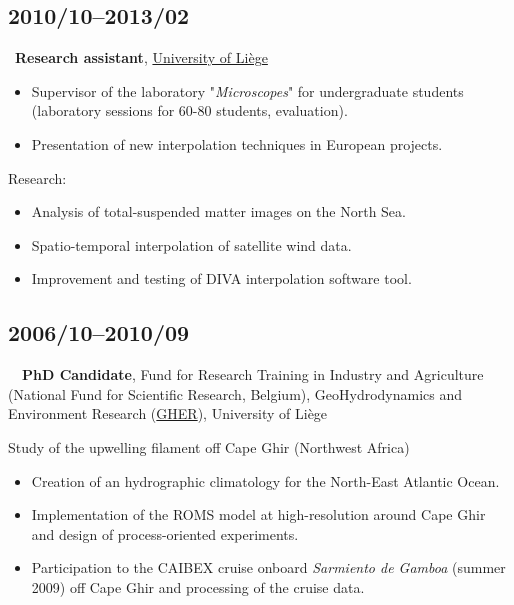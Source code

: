\documentclass[11pt,a4paper,sans,svgnames]{article}
\newlength{\logowidth}
\begin{document}
\subsection{2010/10--2013/02}

~\textbf{Research assistant}, \href{www.ulg.ac.be}{University of Li\`{e}ge}
\begin{itemize}%
\item Supervisor of the laboratory "\textit{Microscopes}" for undergraduate students\\ (laboratory sessions for 60-80 students, evaluation).
\item Presentation of new interpolation techniques in European projects.
\end{itemize}
Research:
\begin{itemize}%
\item Analysis of total-suspended matter images on the North Sea.
\item Spatio-temporal interpolation of satellite wind data.
\item Improvement and testing of DIVA interpolation software tool.
\end{itemize}


\subsection{2006/10--2010/09}

~~{\textbf{PhD Candidate}}, {Fund for Research Training in Industry and Agriculture (National Fund for Scientific Research, Belgium)}, {GeoHydrodynamics and Environment Research (\href{http://modb.oce.ulg.ac.be/}{GHER}), University of Li\`{e}ge}

Study of the upwelling filament off Cape Ghir (Northwest Africa)
\begin{itemize}%
\item Creation of an hydrographic climatology for the North-East Atlantic Ocean.
\item Implementation of the ROMS model at high-resolution around Cape Ghir and design of process-oriented experiments.
\item Participation to the CAIBEX cruise onboard \textit{Sarmiento de Gamboa} (summer 2009) off Cape Ghir and processing of the cruise data.
\end{itemize}
\end{document}
